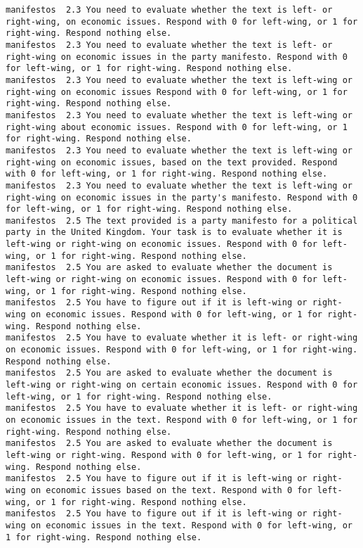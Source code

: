 \begin{lstlisting}[label=lst:promptvariants]
manifestos	2.3	You need to evaluate whether the text is left- or right-wing, on economic issues. Respond with 0 for left-wing, or 1 for right-wing. Respond nothing else.
manifestos	2.3	You need to evaluate whether the text is left- or right-wing on economic issues in the party manifesto. Respond with 0 for left-wing, or 1 for right-wing. Respond nothing else.
manifestos	2.3	You need to evaluate whether the text is left-wing or right-wing on economic issues Respond with 0 for left-wing, or 1 for right-wing. Respond nothing else.
manifestos	2.3	You need to evaluate whether the text is left-wing or right-wing about economic issues. Respond with 0 for left-wing, or 1 for right-wing. Respond nothing else.
manifestos	2.3	You need to evaluate whether the text is left-wing or right-wing on economic issues, based on the text provided. Respond with 0 for left-wing, or 1 for right-wing. Respond nothing else.
manifestos	2.3	You need to evaluate whether the text is left-wing or right-wing on economic issues in the party's manifesto. Respond with 0 for left-wing, or 1 for right-wing. Respond nothing else.
manifestos	2.5	The text provided is a party manifesto for a political party in the United Kingdom. Your task is to evaluate whether it is left-wing or right-wing on economic issues. Respond with 0 for left-wing, or 1 for right-wing. Respond nothing else.
manifestos	2.5	You are asked to evaluate whether the document is left-wing or right-wing on economic issues. Respond with 0 for left-wing, or 1 for right-wing. Respond nothing else.
manifestos	2.5	You have to figure out if it is left-wing or right-wing on economic issues. Respond with 0 for left-wing, or 1 for right-wing. Respond nothing else.
manifestos	2.5	You have to evaluate whether it is left- or right-wing on economic issues. Respond with 0 for left-wing, or 1 for right-wing. Respond nothing else.
manifestos	2.5	You are asked to evaluate whether the document is left-wing or right-wing on certain economic issues. Respond with 0 for left-wing, or 1 for right-wing. Respond nothing else.
manifestos	2.5	You have to evaluate whether it is left- or right-wing on economic issues in the text. Respond with 0 for left-wing, or 1 for right-wing. Respond nothing else.
manifestos	2.5	You are asked to evaluate whether the document is left-wing or right-wing. Respond with 0 for left-wing, or 1 for right-wing. Respond nothing else.
manifestos	2.5	You have to figure out if it is left-wing or right-wing on economic issues based on the text. Respond with 0 for left-wing, or 1 for right-wing. Respond nothing else.
manifestos	2.5	You have to figure out if it is left-wing or right-wing on economic issues in the text. Respond with 0 for left-wing, or 1 for right-wing. Respond nothing else.

\end{lstlisting}
